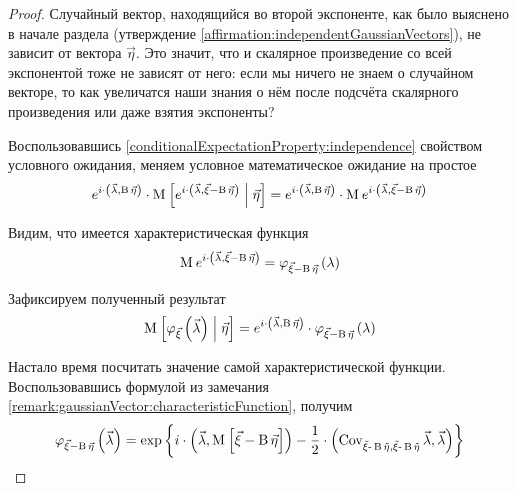 \begin{proof}
    Случайный вектор, находящийся во второй экспоненте, как было выяснено в
    начале раздела (утверждение \ref{affirmation:independentGaussianVectors}),
    не зависит от вектора $\vec{\eta}$. Это значит, что и скалярное произведение
    со всей экспонентой тоже не зависят от него: если мы ничего не знаем о
    случайном векторе, то как увеличатся наши знания о нём после подсчёта
    скалярного произведения или даже взятия экспоненты?

    Воспользовавшись \ref{conditionalExpectationProperty:independence} свойством
    условного ожидания, меняем условное математическое ожидание на простое
    $$e^{i \cdot \left( \vec{\lambda}, \operatorname{B} \vec{\eta} \right)}
            \cdot \operatorname{M}_{} \left[ e^{i \cdot \left( \vec{\lambda},
                \vec{\xi} - \operatorname{B} \vec{\eta} \right)}
            \;\middle|\; \vec{\eta} \right]
        = e^{i \cdot \left( \vec{\lambda}, \operatorname{B} \vec{\eta} \right)}
                \cdot \operatorname{M}_{} e^{i \cdot \left( \vec{\lambda},
                    \vec{\xi} - \operatorname{B} \vec{\eta} \right)}$$

    Видим, что имеется характеристическая функция
    $$\operatorname{M}_{} e^{i \cdot \left( \vec{\lambda},
            \vec{\xi} - \operatorname{B} \vec{\eta} \right)}
        = \varphi_{\vec{\xi} - \operatorname{B} \vec{\eta}}\left(
            \lambda \right)$$

    Зафиксируем полученный результат
    \begin{equation}\label{eq:normalCor:conditionalExpectation}
        \operatorname{M}_{} \left[ \varphi_{\vec{\xi}}\left( \vec{\lambda} \right) \;\middle|\; \vec{\eta} \right]
        = e^{i \cdot \left( \vec{\lambda}, \operatorname{B} \vec{\eta} \right)}
            \cdot \varphi_{\vec{\xi} - \operatorname{B} \vec{\eta}}\left(
                \lambda \right)
    \end{equation}

    Настало время посчитать значение самой характеристической функции.
    Воспользовавшись формулой из замечания
    \ref{remark:gaussianVector:characteristicFunction}, получим
    \begin{align*}
        \varphi_{\vec{\xi} - \operatorname{B} \vec{\eta}}\left(
            \vec{\lambda} \right)
        = \exp{\left\{ i \cdot \left( \vec{\lambda},
            \Mean{\vec{\xi} - \operatorname{B} \vec{\eta}} \right)
            - \frac{1}{2} \cdot \left( \dCov{\vec{\xi}
                - \operatorname{B} \vec{\eta}} \vec{\lambda},
                \vec{\lambda} \right) \right\}}
    \end{align*}


\end{proof}
